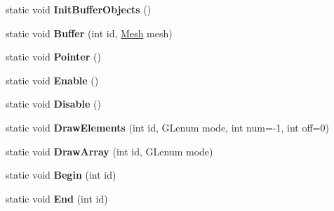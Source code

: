 \begin{DoxyCompactItemize}
\item 
\hypertarget{structvsr_1_1_g_l_1_1_draw_1_1_pipe_a9e219a0d897a2b52d3af246ecfe95793}{static void {\bfseries Init\-Buffer\-Objects} ()}\label{structvsr_1_1_g_l_1_1_draw_1_1_pipe_a9e219a0d897a2b52d3af246ecfe95793}

\item 
\hypertarget{structvsr_1_1_g_l_1_1_draw_1_1_pipe_a9cfd496fb8137478195dda00aaedd566}{static void {\bfseries Buffer} (int id, \hyperlink{structvsr_1_1_mesh}{Mesh} mesh)}\label{structvsr_1_1_g_l_1_1_draw_1_1_pipe_a9cfd496fb8137478195dda00aaedd566}

\item 
\hypertarget{structvsr_1_1_g_l_1_1_draw_1_1_pipe_a546d2e8abff815243ae5c950734a54ea}{static void {\bfseries Pointer} ()}\label{structvsr_1_1_g_l_1_1_draw_1_1_pipe_a546d2e8abff815243ae5c950734a54ea}

\item 
\hypertarget{structvsr_1_1_g_l_1_1_draw_1_1_pipe_a7e9c39f14573415a8676a81306c31344}{static void {\bfseries Enable} ()}\label{structvsr_1_1_g_l_1_1_draw_1_1_pipe_a7e9c39f14573415a8676a81306c31344}

\item 
\hypertarget{structvsr_1_1_g_l_1_1_draw_1_1_pipe_a9314028c12d6bc56c583e1e61807876a}{static void {\bfseries Disable} ()}\label{structvsr_1_1_g_l_1_1_draw_1_1_pipe_a9314028c12d6bc56c583e1e61807876a}

\item 
\hypertarget{structvsr_1_1_g_l_1_1_draw_1_1_pipe_a933886ff8493540d4f30a66fb0ce2f84}{static void {\bfseries Draw\-Elements} (int id, G\-Lenum mode, int num=-\/1, int off=0)}\label{structvsr_1_1_g_l_1_1_draw_1_1_pipe_a933886ff8493540d4f30a66fb0ce2f84}

\item 
\hypertarget{structvsr_1_1_g_l_1_1_draw_1_1_pipe_a1ef28e603ba7ff965910633e07712b63}{static void {\bfseries Draw\-Array} (int id, G\-Lenum mode)}\label{structvsr_1_1_g_l_1_1_draw_1_1_pipe_a1ef28e603ba7ff965910633e07712b63}

\item 
\hypertarget{structvsr_1_1_g_l_1_1_draw_1_1_pipe_aa31ae6a7908bf04e116afaeabd054909}{static void {\bfseries Begin} (int id)}\label{structvsr_1_1_g_l_1_1_draw_1_1_pipe_aa31ae6a7908bf04e116afaeabd054909}

\item 
\hypertarget{structvsr_1_1_g_l_1_1_draw_1_1_pipe_a8d47646a80fd60d2a9292bd1f73a917d}{static void {\bfseries End} (int id)}\label{structvsr_1_1_g_l_1_1_draw_1_1_pipe_a8d47646a80fd60d2a9292bd1f73a917d}

\end{DoxyCompactItemize}
